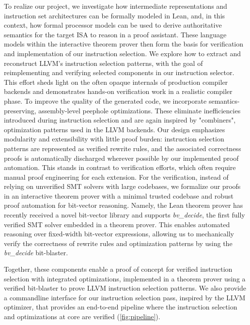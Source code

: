 \documentclass[review, anonymous, acmsmall, screen]{acmart}
\begin{document}
To realize our project, we investigate how intermediate representations and instruction set 
architectures can be formally modeled in Lean, and, in this context, how formal processor models 
can be used to derive authoritative semantics for the target ISA to reason in a proof assistant. 
These language models within the interactive theorem prover then form the basis for verification and 
implementation of our instruction selection. We explore how to extract and reconstruct LLVM’s 
instruction selection patterns, with the goal of reimplementing and verifying selected components 
in our instruction selector. This effort sheds light on the often opaque internals of production 
compiler backends and demonstrates hands-on verification work in a realistic compiler phase. To 
improve the quality of the generated code, we incorporate semantics-preserving, assembly-level 
peephole optimizations. These eliminate inefficiencies introduced during instruction selection and
are again inspired by "combiners", optimization patterns used in the LLVM backends.\newline
Our design emphasizes modularity and extensibility with little proof burden: instruction selection 
patterns are represented as verified rewrite rules, and the associated correctness proofs is 
automatically discharged wherever possible by our implemented proof automation. This stands in 
contrast to verification efforts, which often require  manual proof engineering for each extension. 
For the verification, instead of relying on unverified SMT solvers with large codebases, we formalize
our proofs in an interactive theorem prover with a minimal trusted codebase and robust proof automation
for bit-vector reasoning.\newline
Namely, the Lean theorem prover has recently received a novel bit-vector library and 
supports \textit{bv\_decide}, the first fully verified SMT solver embedded in a 
theorem prover. This enables automated reasoning over fixed-width bit-vector expressions, 
allowing us to mechanically verify the correctness of rewrite rules and optimization patterns by 
using the \textit{bv\_decide} bit-blaster.

Together, these components enable a proof of concept for verified instruction selection with 
integrated optimizations, implemented in a theorem prover using a verified bit-blaster to prove LLVM 
instruction selection patterns. We also provide a commandline interface for our instruction 
selection pass, inspired by the LLVM optimizer, that provides an end-to-end pipeline where the 
instruction selection and optimizations at core are verified (\autoref{fig:pipeline}).
\end{document}

